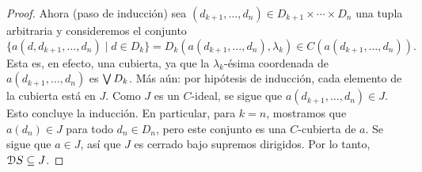 \begin{proof}
  Ahora (paso de inducción) sea
  $(d_{k+1},\dots,d_n)\in D_{k+1}\times\cdots\times D_n$ una tupla
  arbitraria y consideremos el conjunto
  \
  \[
    \{a(d,d_{k+1},\dots,d_n) \mid d\in D_k\}
    =
    D_k(a(d_{k+1},\dots,d_n),\lambda_k)
    \in
    C(a(d_{k+1},\dots,d_n))
  .\]
  Esta es, en efecto, una cubierta, ya que la $\lambda_k$-ésima
  coordenada de $a(d_{k+1},\dots,d_n)$ es $\bigvee D_k$.
  Más aún: por hipótesis de inducción, cada elemento de la cubierta
  está en $J$.
  Como $J$ es un $C$-ideal, se sigue que
  $a(d_{k+1},\dots,d_n)\in J$.
  Esto concluye la inducción.
  En particular, para $k=n$, mostramos que $a(d_n)\in J$ para todo
  $d_n\in D_n$, pero este conjunto es una $C$-cubierta de $a$.
  Se sigue que $a\in J$, así que $J$ es cerrado bajo supremos
  dirigidos.
  Por lo tanto, $\mathcal D S\subseteq J$.
\end{proof}


